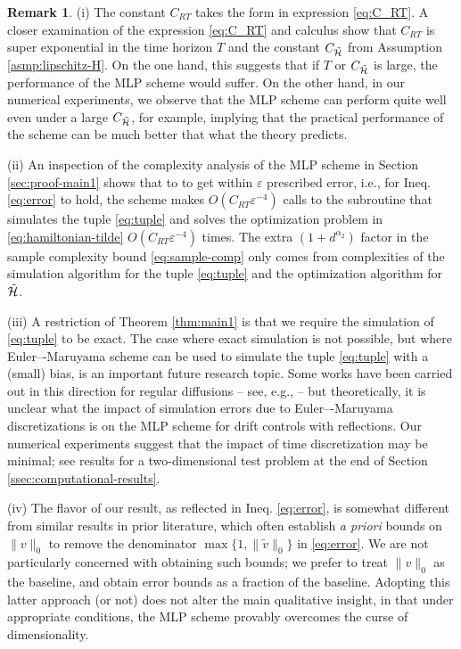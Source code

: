 \documentclass[11pt]{article}
\theoremstyle{definition}
\newtheorem{remark}[assumption]{Remark}
\theoremstyle{plain}
\newcommand{\N}{\mathbb{N}}
\newcommand{\cH}{{\cal H}}
\newcommand{\veps}{\varepsilon}
\begin{document}
\begin{remark}
(i)  The constant $C_{RT}$ takes the form in expression \eqref{eq:C_RT}. A closer examination of the expression \eqref{eq:C_RT} 
and calculus show that $C_{RT}$ is super exponential in the time horizon $T$ and the constant $C_{\tilde \cH}$ from Assumption \ref{asmp:lipschitz-H}. 
On the one hand, this suggests that if $T$ or $C_{\tilde \cH}$ is large, the performance of the MLP scheme would suffer. 
On the other hand, in our numerical experiments, we observe that the MLP scheme can perform quite well even under a large $C_{\tilde \cH}$, for example,  
implying that the practical performance of the scheme can be much better that what the theory predicts. 

(ii) An inspection of the complexity analysis of the MLP scheme in Section \ref{sec:proof-main1} 
shows that to to get within $\veps$ prescribed error, i.e., for Ineq. \eqref{eq:error} to hold, 
the scheme makes $O\left(C_{RT} \veps^{-4}\right)$ calls to the subroutine that simulates the tuple \eqref{eq:tuple} 
and solves the optimization problem in \eqref{eq:hamiltonian-tilde} $O\left(C_{RT} \veps^{-4}\right)$ times. 
The extra $(1+d^{\alpha_2})$ factor in the sample complexity bound \eqref{eq:sample-comp} only comes from complexities 
of the simulation algorithm for the tuple \eqref{eq:tuple} and the optimization algorithm for $\tilde \cH$. 

(iii) A restriction of Theorem \ref{thm:main1} is that we require the simulation of \eqref{eq:tuple} to be exact. 
The case where exact simulation is not possible, but where Euler–-Maruyama scheme can be used to simulate the tuple \eqref{eq:tuple} with a (small) bias, 
is an important future research topic. Some works have been carried out in this direction for regular diffusions 
-- see, e.g., \cite{NeufeldNguyenWu2025,NeufeldWu2025} -- but theoretically, 
it is unclear what the impact of simulation errors due to Euler–-Maruyama discretizations is  
on the MLP scheme for drift controls with reflections. 
Our numerical experiments suggest that the impact of time discretization may be minimal; 
see results for a two-dimensional test problem at the end of Section \ref{ssec:computational-results}. 


(iv) The flavor of our result, as reflected in Ineq. \eqref{eq:error}, is somewhat different from similar results in prior literature, 
which often establish {\em a priori} bounds on $\|v\|_0$ to remove the denominator $\max\{1, \|\tilde v\|_0\}$ in \eqref{eq:error}. 
We are not particularly concerned with obtaining such bounds; we prefer to treat $\|v\|_0$ as the baseline, 
and obtain error bounds as a fraction of the baseline. Adopting this latter approach (or not) does not alter  
the main qualitative insight, in that under appropriate conditions, the MLP scheme provably overcomes the curse of dimensionality. 
\end{remark}
\end{document}
